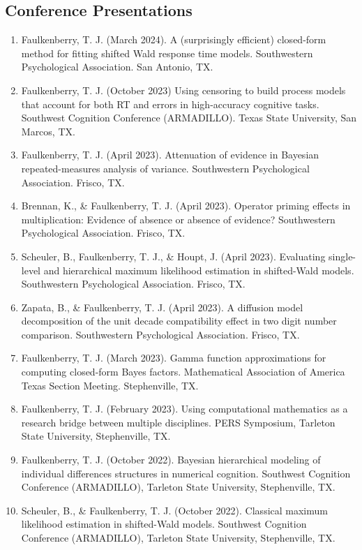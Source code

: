 \documentclass[article,10pt]{article}
\begin{document}
\subsection*{Conference Presentations}
\label{sec:org5eac04a}
\begin{enumerate}
\item Faulkenberry, T. J. (March 2024). A (surprisingly efficient) closed-form method for fitting shifted Wald response time models. Southwestern Psychological Association. San Antonio, TX.
\item Faulkenberry, T. J. (October 2023) Using censoring to build process models that account for both RT and errors in high-accuracy cognitive tasks. Southwest Cognition Conference (ARMADILLO). Texas State University, San Marcos, TX.
\item Faulkenberry, T. J. (April 2023). Attenuation of evidence in Bayesian repeated-measures analysis of variance. Southwestern Psychological Association. Frisco, TX.
\item Brennan, K., \& Faulkenberry, T. J. (April 2023). Operator priming effects in multiplication: Evidence of absence or absence of evidence? Southwestern Psychological Association. Frisco, TX.
\item Scheuler, B., Faulkenberry, T. J., \& Houpt, J. (April 2023). Evaluating single-level and hierarchical maximum likelihood estimation in shifted-Wald models. Southwestern Psychological Association. Frisco, TX.
\item Zapata, B., \& Faulkenberry, T. J. (April 2023). A diffusion model decomposition of the unit decade compatibility effect in two digit number comparison. Southwestern Psychological Association. Frisco, TX.
\item Faulkenberry, T. J. (March 2023). Gamma function approximations for computing closed-form Bayes factors. Mathematical Association of America Texas Section Meeting. Stephenville, TX.
\item Faulkenberry, T. J. (February 2023). Using computational mathematics as a research bridge between multiple disciplines. PERS Symposium, Tarleton State University, Stephenville, TX.
\item Faulkenberry, T. J. (October 2022). Bayesian hierarchical modeling of individual differences structures in numerical cognition. Southwest Cognition Conference (ARMADILLO), Tarleton State University, Stephenville, TX.
\item Scheuler, B., \& Faulkenberry, T. J. (October 2022). Classical maximum likelihood estimation in shifted-Wald models. Southwest Cognition Conference (ARMADILLO), Tarleton State University, Stephenville, TX.

\end{enumerate}
\end{document}
